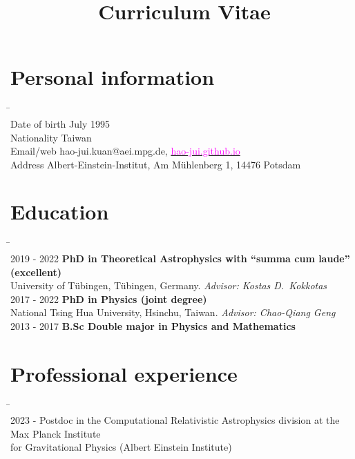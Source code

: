 \documentclass[11pt,a4paper,sans]{moderncv}
\title{Curriculum Vitae}
\begin{document}
\makecvtitle
\vspace{-1cm}
\section{Personal information}
\begin{tabbing}
\hspace*{2.3cm} \= \hspace*{10cm} \\[-3ex]
Date of birth  July 1995\\
Nationality \> Taiwan\\
Email/web \> hao-jui.kuan@aei.mpg.de, \href{https://hao-jui.github.io}{\textcolor{magenta}{hao-jui.github.io}}\\
Address\> Albert-Einstein-Institut, Am M{\"u}hlenberg 1, 14476 Potsdam
\end{tabbing}

\section{Education}
\begin{tabbing}
\hspace*{2.3cm} \= \hspace*{10cm} \\[-3ex]
2019 - 2022 \> \textbf{PhD in Theoretical Astrophysics with  ``summa cum laude'' (excellent)}\\
\> University of T{\"u}bingen, T\"ubingen, Germany. \textit{Advisor: Kostas D.~Kokkotas} \\
%
2017 - 2022 \> \textbf{PhD in Physics (joint degree)}\\
\> National Tsing Hua University, Hsinchu, Taiwan. \textit{Advisor: Chao-Qiang Geng} \\
%
2013 - 2017 \> \textbf{B.Sc Double major in Physics and Mathematics}
\end{tabbing}


\section{Professional experience}
\begin{tabbing}
\hspace*{2.3cm} \= \hspace*{10cm} \\[-3ex]
2023 - \> Postdoc in the Computational Relativistic Astrophysics division at the Max Planck Institute \\
\> for Gravitational Physics (Albert Einstein Institute)
\end{tabbing}
\end{document}
